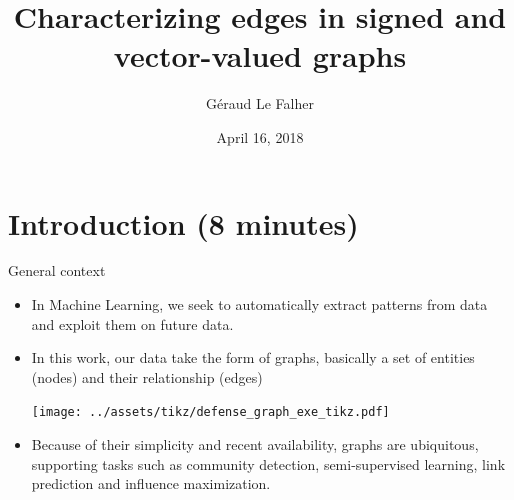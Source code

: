 \documentclass[10pt,svgnames,ignorenonframetext,final]{beamer}
\title{Characterizing edges in signed and vector-valued graphs}
\author{Géraud Le Falher}
\date{April 16, 2018}
\providecommand{\tightlist}{%
  \setlength{\itemsep}{0pt}\setlength{\parskip}{0pt}}
\begin{document}
\frame{\titlepage}


\section{Introduction (8 minutes)}\label{introduction-8-minutes}

\begin{frame}{General context}
\protect\hypertarget{general-context}{}

\begin{itemize}
\item
  In Machine Learning, we seek to automatically extract patterns from
  data and exploit them on future data.
\item
  In this work, our data take the form of graphs, basically a set of
  entities (nodes) and their relationship (edges)
\begin{center}
\texttt{[image: ../assets/tikz/defense\_graph\_exe\_tikz.pdf]}
\end{center}

\item
  Because of their simplicity and recent availability, graphs are
  ubiquitous, supporting tasks such as community detection,
  semi-supervised learning, link prediction and influence maximization.
\end{itemize}

\end{frame}
\end{document}
